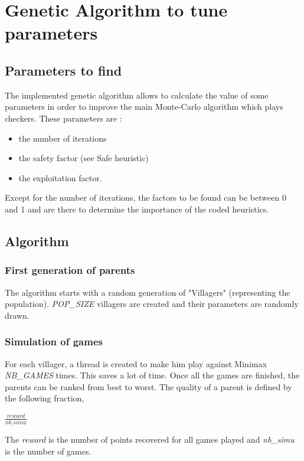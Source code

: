 \documentclass[11pt,a4paper]{article}
\begin{document}
\section{Genetic Algorithm to tune parameters}
\subsection{Parameters to find}\label{params}
The implemented genetic algorithm allows to calculate the value of some parameters in order to improve the main Monte-Carlo algorithm which plays checkers. These parameters are : 
\begin{itemize}
    \item the number of iterations
    \item the safety factor (see Safe heuristic)
    \item the exploitation factor.
\end{itemize}
Except for the number of iterations, the factors to be found can be between 0 and 1 and are there to determine the importance of the coded heuristics.
\subsection{Algorithm}
\subsubsection{First generation of parents}
The algorithm starts with a random generation of "Villagers" (representing the population). \textit{POP\_SIZE} villagers are created and their parameters are randomly drawn.
\subsubsection{Simulation of games}
For each villager, a thread is created to make him play against Minimax \textit{NB\_GAMES} times. This saves a lot of time. Once all the games are finished, the parents can be ranked from best to worst. The quality of a parent is defined by the following fraction,
\begin{center}
    $\frac{reward}{nb\_simu}$
\end{center}
The \textit{reward} is the number of points recovered for all games played and \textit{nb\_simu} is the number of games.
\end{document}

